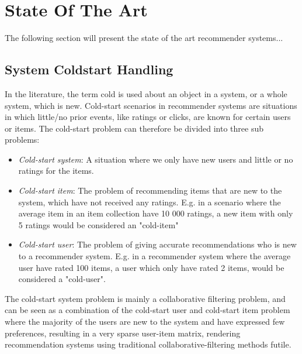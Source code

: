 
\section{State Of The Art}

The following section will present the state of the art recommender systems...

\subsection{System Coldstart Handling}


In the literature, the term cold is used about an object in a system, or a
whole system, which is new. Cold-start scenarios in recommender systems are
situations in which little/no prior events, like ratings or clicks, are known
for certain users or items. The cold-start problem can therefore be divided
  into three sub problems:

\begin{itemize}
  \item \emph{Cold-start system}: A situation where we only have new users and
  little or no ratings for the items.

  \item \emph{Cold-start item}: The problem of recommending items that are new
  to the system, which have not received any ratings. E.g. in a scenario where
  the average item in an item collection have 10 000 ratings, a new item with
  only 5 ratings would be considered an "cold-item"

  \item \emph{Cold-start user}: The problem of giving accurate recommendations
  who is new to a recommender system. E.g. in a recommender system where the
  average user have rated 100 items, a user which only have rated 2 items,
  would be considered a "cold-user".
\end{itemize}

The cold-start system problem is mainly a collaborative filtering problem, and
can be seen as a combination of the cold-start user and cold-start item problem
where the majority of the users are new to the system and have expressed few
preferences, resulting in a very sparse user-item matrix, rendering
recommendation systems using traditional collaborative-filtering methods
futile.

